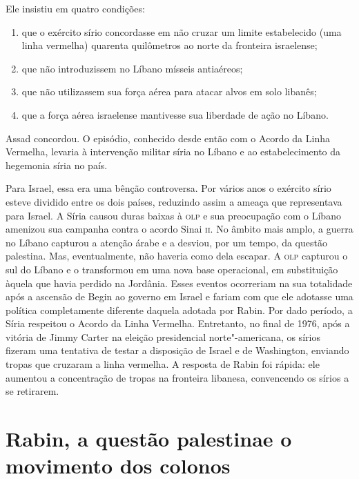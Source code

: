 Ele insistiu em quatro condições:

\begin{enumerate}
\def\labelenumi{\arabic{enumi}.}
\item
  que o exército sírio concordasse em não cruzar um limite estabelecido
  (uma linha vermelha) quarenta quilômetros ao norte da fronteira
  israelense;
\item
  que não introduzissem no Líbano mísseis antiaéreos;
\item
  que não utilizassem sua força aérea para atacar alvos em solo
  libanês;
\item
  que a força aérea israelense mantivesse sua liberdade de ação no
  Líbano.
\end{enumerate}

Assad concordou. O episódio, conhecido desde então com o Acordo da Linha
Vermelha,
levaria à intervenção militar síria no Líbano e ao estabelecimento da
hegemonia síria no país.

Para Israel, essa era uma bênção controversa. Por vários anos o exército sírio
esteve dividido entre os dois países, reduzindo assim a ameaça que
representava para Israel. A Síria causou duras baixas à \textsc{olp} e sua
preocupação com o Líbano amenizou sua campanha contra o acordo Sinai \textsc{ii}.
No âmbito mais amplo, a guerra no Líbano capturou a atenção árabe e a
desviou, por um tempo, da questão palestina. Mas, eventualmente, não
haveria como dela escapar. A \textsc{olp} capturou o sul do Líbano e o
transformou em uma nova base operacional, em substituição àquela que
havia perdido na Jordânia. Esses eventos ocorreriam na sua totalidade
após a ascensão de Begin ao governo em Israel e fariam com que ele
adotasse uma política completamente diferente daquela adotada por Rabin.
Por dado período, a Síria respeitou o Acordo da Linha Vermelha. Entretanto, no
final de 1976, após a vitória de Jimmy Carter na eleição presidencial
norte"-americana, os sírios fizeram uma tentativa de testar a disposição
de Israel e de Washington, enviando tropas que cruzaram a linha
vermelha. A resposta de Rabin foi rápida: ele aumentou a concentração de
tropas na fronteira libanesa, convencendo os sírios a se
retirarem.

\section{Rabin, a questão palestina\break e o movimento dos colonos}

